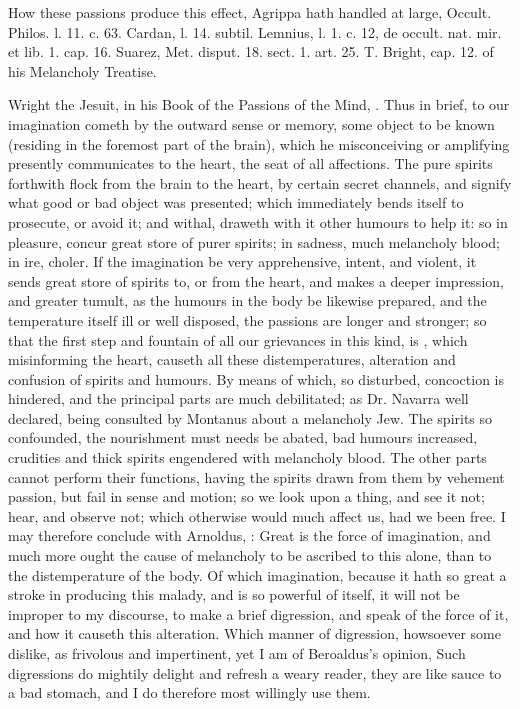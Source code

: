 {{How these passions produce this effect, Agrippa hath handled at
large, \textlatin{Occult. Philos. l. 11. c. 63. Cardan, l. 14. subtil. Lemnius, l.
1. c. 12, de occult. nat. mir. et lib. 1. cap. 16. Suarez, Met. disput.
18. sect. 1. art. 25. T. Bright, cap. 12.} of his Melancholy Treatise.

Wright the Jesuit, in his Book of the Passions of the Mind, \etc{}. Thus in
brief, to our imagination cometh by the outward sense or memory, some
object to be known (residing in the foremost part of the brain), which
he misconceiving or amplifying presently communicates to the heart, the
seat of all affections. The pure spirits forthwith flock from the brain
to the heart, by certain secret channels, and signify what good or bad
object was presented; which immediately bends itself to
prosecute, or avoid it; and withal, draweth with it other humours to
help it: so in pleasure, concur great store of purer spirits; in
sadness, much melancholy blood; in ire, choler. If the imagination be
very apprehensive, intent, and violent, it sends great store of spirits
to, or from the heart, and makes a deeper impression, and greater
tumult, as the humours in the body be likewise prepared, and the
temperature itself ill or well disposed, the passions are longer and
stronger; so that the first step and fountain of all our grievances in
this kind, is , which misinforming the heart,
causeth all these distemperatures, alteration and confusion of spirits
and humours. By means of which, so disturbed, concoction is hindered,
and the principal parts are much debilitated; as Dr. Navarra well
declared, being consulted by Montanus about a melancholy Jew. The
spirits so confounded, the nourishment must needs be abated, bad
humours increased, crudities and thick spirits engendered with
melancholy blood. The other parts cannot perform their functions,
having the spirits drawn from them by vehement passion, but fail in
sense and motion; so we look upon a thing, and see it not; hear, and
observe not; which otherwise would much affect us, had we been free. I
may therefore conclude with Arnoldus, : Great is the force of imagination, and much more
ought the cause of melancholy to be ascribed to this alone, than to the
distemperature of the body. Of which imagination, because it hath so
great a stroke in producing this malady, and is so powerful of itself,
it will not be improper to my discourse, to make a brief digression,
and speak of the force of it, and how it causeth this alteration. Which
manner of digression, howsoever some dislike, as frivolous and
impertinent, yet I am of Beroaldus's opinion, Such digressions do
mightily delight and refresh a weary reader, they are like sauce to a
bad stomach, and I do therefore most willingly use them.

}}
